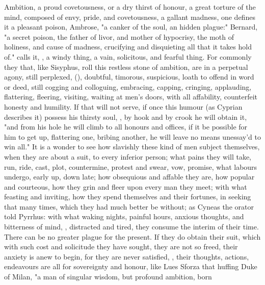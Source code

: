 Ambition, a proud covetousness, or a dry thirst of honour, a great torture of
the mind, composed of envy, pride, and covetousness, a gallant madness, one
defines it a pleasant poison, Ambrose, "a canker of the
soul, an hidden plague:" Bernard, "a secret poison, the
father of livor, and mother of hypocrisy, the moth of holiness, and cause of
madness, crucifying and disquieting all that it takes hold of."
\Seneca{} calls it, , a windy thing, a vain, solicitous, and fearful thing. For commonly
they that, like Sisyphus, roll this restless stone of ambition, are in a
perpetual agony, still perplexed,  (\Lucretius{}), doubtful, timorous, suspicious, loath to
offend in word or deed, still cogging and colloguing, embracing, capping,
cringing, applauding, flattering, fleering, visiting, waiting at men's doors,
with all affability, counterfeit honesty and humility. If
that will not serve, if once this humour (as Cyprian
describes it) possess his thirsty soul, , by hook and by crook he will obtain it, "and from his hole he
will climb to all honours and offices, if it be possible for him to get up,
flattering one, bribing another, he will leave no means unessay'd to win all."
It is a wonder to see how slavishly these kind of men
subject themselves, when they are about a suit, to every inferior person; what
pains they will take, run, ride, cast, plot, countermine, protest and swear,
vow, promise, what labours undergo, early up, down late; how obsequious and
affable they are, how popular and courteous, how they grin and fleer upon every
man they meet; with what feasting and inviting, how they spend themselves and
their fortunes, in seeking that many times, which they had much better be
without; as Cyneas the orator told Pyrrhus: with what
waking nights, painful hours, anxious thoughts, and bitterness of mind,
, distracted and tired, they consume the interim of
their time. There can be no greater plague for the present. If they do obtain
their suit, which with such cost and solicitude they have sought, they are not
so freed, their anxiety is anew to begin, for they are never satisfied,
, their thoughts, actions, endeavours are
all for sovereignty and honour, like Lues Sforza that
huffing Duke of Milan, "a man of singular wisdom, but profound ambition, born
